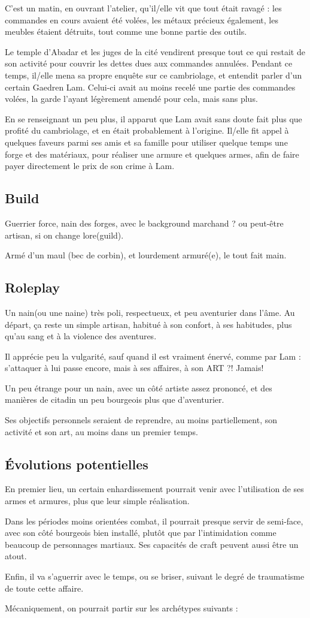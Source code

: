 \documentclass[10pt,a4paper]{book}
\begin{document}
C'est un matin, en ouvrant l'atelier, qu'il/elle vit que tout était ravagé : les commandes en cours avaient été volées, les métaux précieux également, les meubles étaient détruits, tout comme une bonne partie des outils.

Le temple d'Abadar et les juges de la cité vendirent presque tout ce qui restait de son activité pour couvrir les dettes dues aux commandes annulées. Pendant ce temps, il/elle mena sa propre enquête sur ce cambriolage, et entendit parler d'un certain Gaedren Lam. Celui-ci avait au moins recelé une partie des commandes volées, la garde l'ayant légèrement amendé pour cela, mais sans plus. 

En se renseignant un peu plus, il apparut que Lam avait sans doute fait plus que profité du cambriolage, et en était probablement à l'origine. Il/elle fit appel à quelques faveurs parmi ses amis et sa famille pour utiliser quelque temps une forge et des matériaux, pour réaliser une armure et quelques armes, afin de faire payer directement le prix de son crime à Lam.
\subsection{Build}
Guerrier force, nain des forges, avec le background marchand ? ou peut-être artisan, si on change lore(guild).

Armé d'un maul (bec de corbin), et lourdement armuré(e), le tout fait main.
\subsection{Roleplay}
Un nain(ou une naine) très poli, respectueux, et peu aventurier dans l'âme. Au départ, ça reste un simple artisan, habitué à son confort, à ses habitudes, plus qu'au sang et à la violence des aventures.

Il apprécie peu la vulgarité, sauf quand il est vraiment énervé, comme par Lam : s'attaquer à lui passe encore, mais à ses affaires, à son ART ?! Jamais!

Un peu étrange pour un nain, avec un côté artiste assez prononcé, et des manières de citadin un peu bourgeois plus que d'aventurier.

Ses objectifs personnels seraient de reprendre, au moins partiellement, son activité et son art, au moins dans un premier temps.
\subsection{Évolutions potentielles}
En premier lieu, un certain enhardissement pourrait venir avec l'utilisation de ses armes et armures, plus que leur simple réalisation.

Dans les périodes moins orientées combat, il pourrait presque servir de semi-face, avec son côté bourgeois bien installé, plutôt que par l'intimidation comme beaucoup de personnages martiaux. Ses capacités de craft peuvent aussi être un atout.

Enfin, il va s'aguerrir avec le temps, ou se briser, suivant le degré de traumatisme de toute cette affaire.

Mécaniquement, on pourrait partir sur les archétypes suivants : 
\end{document}
